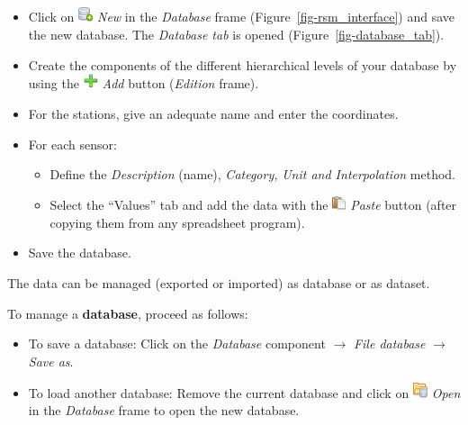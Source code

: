 \documentclass[
  letterpaper,
  DIV=11,
  numbers=noendperiod]{scrreprt}
\begin{document}
\begin{itemize}
\item
  {Click on
  \includegraphics[width=0.17in,height=0.17in]{./figures/fig-icon_database_new.png}
  \emph{New} in the \emph{Database} frame
  (Figure~\ref{fig-rsm_interface}) and save the new database. The
  \emph{Database tab} is opened (Figure~\ref{fig-database_tab}).}
\item
  {Create the components of the different hierarchical levels of your
  database by using the
  \includegraphics[width=0.17in,height=0.17in]{./figures/fig-icon_plus.png}
  \emph{Add} button (\emph{Edition} frame).}
\item
  {For the stations, give an adequate name and enter the coordinates.}
\item
  {For each sensor:}

  \begin{itemize}
  \item
    {Define the \emph{Description} (name), \emph{Category,} \emph{Unit
    and Interpolation} method.}
  \item
    {Select the ``Values'' tab and add the data with the
    \includegraphics[width=0.16in,height=0.16in]{./figures/fig-icon_paste.png}
    \emph{Paste} button (after copying them from any spreadsheet
    program).}
  \end{itemize}
\item
  {Save the database.}
\end{itemize}

The data can be managed (exported or imported) as database or as
dataset.

To manage a \textbf{database}, proceed as follows:

\begin{itemize}
\item
  {To save a database: Click on the \emph{Database} component
  \(\rightarrow\) \emph{File database} \(\rightarrow\) \emph{Save as}.}
\item
  {To load another database: Remove the current database and click on
  \includegraphics[width=0.17in,height=0.17in]{./figures/fig-icon_database_open.png}
  \emph{Open} in the \emph{Database} frame to open the new database.}
\end{itemize}
\end{document}
